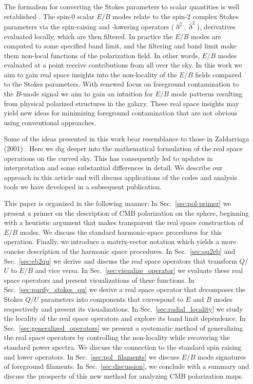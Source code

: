 \documentclass[a4paper,11pt]{article}
\def\sec#1{{Sec.~\ref{#1}}}
\begin{document}
The formalism for converting the Stokes parameters to scalar quantities is well established \citep{1997PhRvD..55.7368K,1997PhRvD..55.1830Z}. The spin-0 scalar $E$/$B$ modes relate to the spin-2 complex Stokes parameters via the spin-raising and -lowering operators ($\eth^2,\bar \eth^2$), derivatives evaluated locally,  which are then filtered.  In practice the $E$/$B$ modes are computed to some specified band limit, and the filtering and band limit make them non-local functions of the polarization field.  In other words, $E$/$B$ modes evaluated at a point receive contributions from all over the sky. In this work we aim to gain real space insights into the non-locality of the $E/B$ fields compared to the Stokes parameters. With renewed focus on foreground contamination to the $B$-mode signal we aim to gain an intuition for $E/B$ mode patterns resulting from physical polarized structures in the galaxy. These real space insights may yield new ideas for minimizing foreground contamination that are not obvious using conventional approaches. 

{Some of the ideas presented in this work bear resemblance to those in Zaldarriaga (2001) \citep{Zaldarriaga2001a}.  Here we dig deeper into the mathematical formulation of the real space operations on the curved sky.  This has consequently led to updates in interpretation and some substantial differences in detail.  We describe our approach in this article and will discuss applications of the codes and analysis tools we have developed in a subsequent publication.}
 
This paper is organized in the following manner: In \sec{sec:pol-primer} we present a primer on the description of CMB polarization on the sphere, beginning with a heuristic argument that makes transparent the real space construction of $E$/$B$ modes.  We discuss the standard harmonic-space procedures for this operation. Finally, we introduce a matrix-vector notation which yields a more concise description of the harmonic space procedures. In \sec{sec:qu2eb} and \sec{sec:eb2qu} we derive and discuss the real space operators that transform $Q$/$U$ to $E$/$B$ and vice versa. In \sec{sec:visualize_operator} we evaluate these real space operators and present visualizations of these functions. In \sec{sec:purify_stokes_qu} we derive a real space operator that decomposes the Stokes $Q$/$U$  parameters into components that correspond to $E$ and $B$ modes respectively and present its visualizations.  In \sec{sec:radial_locality} we study the locality of the real space operators and explore its band limit dependence. In \sec{sec:generalized_operators} we present a systematic method of generalizing the real space operators by controlling the non-locality while recovering the standard power spectra.  We discuss the connection to the standard spin raising and lower operators. In \sec{sec:pol_filaments} we discuss $E/B$ mode signatures of foreground filaments. In \sec{sec:discussion}, we conclude with a summary and discuss the prospects of this new method for analyzing CMB polarization maps.
\end{document}

